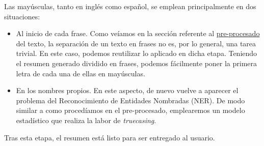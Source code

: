 Las mayúsculas, tanto en inglés como español, se emplean principalmente en dos situaciones:

\vspace*{-\baselineskip}
\begin{itemize}
	\item [\textbullet] Al inicio de cada frase. Como veíamos en la sección referente al \hyperref[sec:preprocesado]{pre-procesado} del texto, la separación de un texto en frases no es, por lo general, una tarea trivial. En este caso, podemos reutilizar lo aplicado en dicha etapa. Teniendo el resumen generado dividido en frases, podemos fácilmente poner la primera letra de cada una de ellas en mayúsculas.
	\item [\textbullet] En los nombres propios. En este aspecto, de nuevo vuelve a aparecer el problema del Reconocimiento de Entidades Nombradas (NER). De modo similar a como procedíamos en el pre-procesado, emplearemos un modelo estadístico que realiza la labor de \emph{truecasing}.
\end{itemize}

Tras esta etapa, el resumen está listo para ser entregado al usuario.